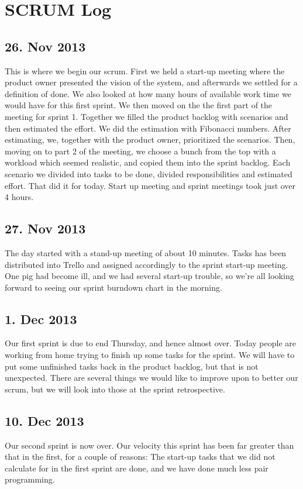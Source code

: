 \section{SCRUM Log}
\label{chap:SCRUM Log}

\subsection{26. Nov 2013}
This is where we begin our scrum. First we held a start-up meeting where the product owner presented the vision of the system, and afterwards we settled for a definition of done. We also looked at how many hours of available work time we would have for this first sprint. We then moved on the the first part of the meeting for sprint 1. Together we filled the product backlog with scenarios and then estimated the effort. We did the estimation with Fibonacci numbers. After estimating, we, together with the product owner, prioritized the scenarios. Then, moving on to part 2 of the meeting, we choose a bunch from the top with a workload which seemed realistic, and copied them into the sprint backlog. Each scenario we divided into tasks to be done, divided responsibilities and estimated effort. That did it for today. Start up meeting and sprint meetings took just over 4 hours.


\subsection{27. Nov 2013}
The day started with a stand-up meeting of about 10 minutes. Tasks has been distributed into Trello and assigned accordingly to the sprint start-up meeting. One pig had become ill, and we had several start-up trouble, so we're all looking forward to seeing our sprint burndown chart in the morning.

\subsection{1. Dec 2013}
Our first sprint is due to end Thursday, and hence almost over. Today people are working from home trying to finish up some tasks for the sprint. We will have to put some unfinished tasks back in the product backlog, but that is not unexpected. There are several things we would like to improve upon to better our scrum, but we will look into those at the sprint retrospective.

\subsection{10. Dec 2013}
Our second sprint is now over. Our velocity this sprint has been far greater than that in the first, for a couple of reasons: The start-up tasks that we did not calculate for in the first sprint are done, and we have done much less pair programming.

